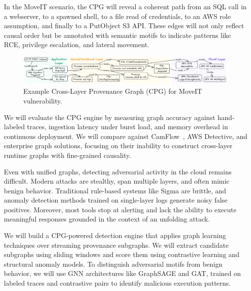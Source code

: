 In the MoveIT scenario, the CPG will reveal a coherent path from an SQL call in a webserver, to a spawned shell, to a file read of credentials, to an AWS role assumption, and finally to a PutObject S3 API. These edges will not only reflect causal order but be annotated with semantic motifs to indicate patterns like RCE, privilege escalation, and lateral movement.

\begin{figure}[t!]
    \centering \includegraphics[width=0.99\textwidth]{fig/graph-example.png}
    \caption{Example Cross-Layer Provenance Graph (CPG) for MoveIT vulnerability.}
    \label{fig:arch}
    \end{figure}

We will evaluate the CPG engine by measuring graph accuracy against hand-labeled traces, ingestion latency under burst load, and memory overhead in continuous deployment. We will compare against CamFlow~\cite{camflow}, AWS Detective, and enterprise graph solutions, focusing on their inability to construct cross-layer runtime graphs with fine-grained causality.


Even with unified graphs, detecting adversarial activity in the cloud remains difficult. Modern attacks are stealthy, span multiple layers, and often mimic benign behavior. Traditional rule-based systems like Sigma are brittle, and anomaly detection methods trained on single-layer logs generate noisy false positives. Moreover, most tools stop at alerting and lack the ability to execute meaningful responses grounded in the context of an unfolding attack.

We will build a CPG-powered detection engine that applies graph learning techniques over streaming provenance subgraphs. We will extract candidate subgraphs using sliding windows and score them using contrastive learning and structural anomaly models. To distinguish adversarial motifs from benign behavior, we will use GNN architectures like GraphSAGE and GAT, trained on labeled traces and contrastive pairs to identify malicious execution patterns.

